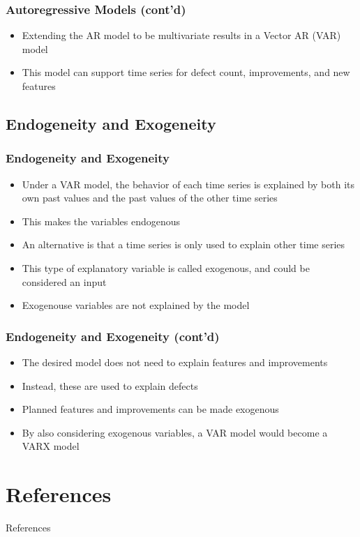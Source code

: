 \documentclass[presentation]{beamer}
\begin{document}
\begin{frame}[t]
\frametitle{Autoregressive Models (cont'd)}
\begin{itemize}
\item{Extending the AR model to be multivariate results in a Vector AR (VAR) model}
\item{This model can support time series for defect count, improvements, and new features}
\end{itemize}
\end{frame}

\subsection{Endogeneity and Exogeneity}

\begin{frame}[t]
\frametitle{Endogeneity and Exogeneity}
\begin{itemize}
\item{Under a VAR model, the behavior of each time series is explained by both
its own past values and the past values of the other time series}
\item{This makes the variables endogenous}
\item{An alternative is that a time series is only used to explain other time series}
\item{This type of explanatory variable is called exogenous, and could be considered an input}
\item{Exogenouse variables are not explained by the model}
\end{itemize}
\end{frame}

\begin{frame}[t]
\frametitle{Endogeneity and Exogeneity (cont'd)}
\begin{itemize}
\item{The desired model does not need to explain features and improvements}
\item{Instead, these are used to explain defects}
\item{Planned features and improvements can be made exogenous}
\item{By also considering exogenous variables, a VAR model would become a
VARX model}
\end{itemize}
\end{frame}

\section{References}

\begin{frame}[allowframebreaks]{References}
\begin{center}


\end{center}
\end{frame}
\end{document}
